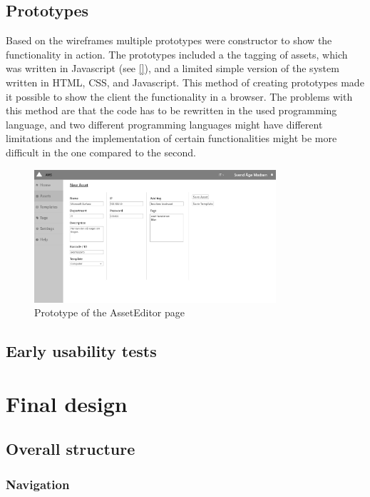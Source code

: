\subsection{Prototypes}
Based on the wireframes multiple prototypes were constructor to show the functionality in action. The prototypes included a the tagging of assets, which was written in Javascript (see \autoref{}), and a limited simple version of the system written in HTML, CSS, and Javascript. This method of creating prototypes made it possible to show the client the functionality in a browser. The problems with this method are that the code has to be rewritten in the used programming language, and two different programming languages might have different limitations and the implementation of certain functionalities might be more difficult in the one compared to the second.

\begin{figure}[H]
    \centering
    \includegraphics[width=0.8\textwidth]{figures/wireframes/AssetEditor_Wireframe.png}
    \caption{Prototype of the AssetEditor page}
    \label{fig:PrototypeOfTagging}
\end{figure}

\subsection{Early usability tests}


\section{Final design}

\subsection{Overall structure}

\subsubsection*{Navigation}


